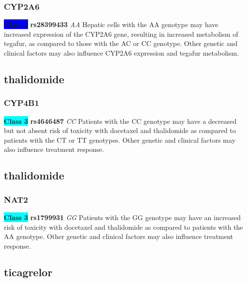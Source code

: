 \documentclass{book}
\begin{document}
\subsubsection{ CYP2A6 }

\begin{center}

\textbf{\colorbox{blue} {Class 4}} \textbf{ rs28399433 } \textit{ AA }
Hepatic cells with the AA genotype may have increased expression of the CYP2A6 gene, resulting in increased metabolism of tegafur, as compared to those with the AC or CC genotype. Other genetic and clinical factors may also influence CYP2A6 expression and tegafur metabolism.

\end{center}\subsection{ thalidomide }


\subsubsection{ CYP4B1 }

\begin{center}
\textbf{\colorbox{cyan} {Class 3}} \textbf{ rs4646487 } \textit{ CC }
Patients with the CC genotype may have a decreased but not absent risk of toxicity with docetaxel and thalidomide as compared to patients with the CT or TT genotypes. Other genetic and clinical factors may also influence treatment response.


\end{center}\subsection{ thalidomide }


\subsubsection{ NAT2 }

\begin{center}
\textbf{\colorbox{cyan} {Class 3}} \textbf{ rs1799931 } \textit{ GG }
Patients with the GG genotype may have an increased risk of toxicity with docetaxel and thalidomide as compared to patients with the AA genotype. Other genetic and clinical factors may also influence treatment response.


\end{center}\subsection{ ticagrelor }
\end{document}
